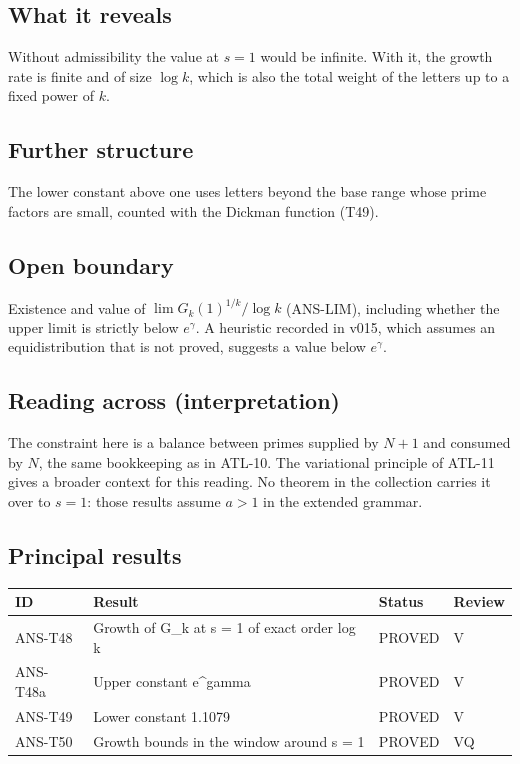 \documentclass[
  11pt,
]{article}
\begin{document}
\hypertarget{what-it-reveals-8}{%
\subsection{What it reveals}\label{what-it-reveals-8}}

Without admissibility the value at \(s=1\) would be infinite. With it,
the growth rate is finite and of size \(\log k\), which is also the
total weight of the letters up to a fixed power of \(k\).

\hypertarget{further-structure-8}{%
\subsection{Further structure}\label{further-structure-8}}

The lower constant above one uses letters beyond the base range whose
prime factors are small, counted with the Dickman function (T49).

\hypertarget{open-boundary-8}{%
\subsection{Open boundary}\label{open-boundary-8}}

Existence and value of \(\lim G_k(1)^{1/k}/\log k\) (ANS-LIM), including
whether the upper limit is strictly below \(e^{\gamma}\). A heuristic
recorded in v015, which assumes an equidistribution that is not proved,
suggests a value below \(e^{\gamma}\).

\hypertarget{reading-across-interpretation-8}{%
\subsection{Reading across
(interpretation)}\label{reading-across-interpretation-8}}

The constraint here is a balance between primes supplied by \(N+1\) and
consumed by \(N\), the same bookkeeping as in ATL-10. The variational
principle of ATL-11 gives a broader context for this reading. No theorem
in the collection carries it over to \(s=1\): those results assume
\(a>1\) in the extended grammar.

\hypertarget{principal-results-8}{%
\subsection{Principal results}\label{principal-results-8}}

\begin{longtable}[]{@{}llll@{}}
\toprule
ID & Result & Status & Review\tabularnewline
\midrule
\endhead
ANS-T48 & Growth of G\_k at s = 1 of exact order log k & PROVED &
V\tabularnewline
ANS-T48a & Upper constant e\^{}gamma & PROVED & V\tabularnewline
ANS-T49 & Lower constant 1.1079 & PROVED & V\tabularnewline
ANS-T50 & Growth bounds in the window around s = 1 & PROVED &
VQ\tabularnewline
\bottomrule
\end{longtable}
\end{document}
